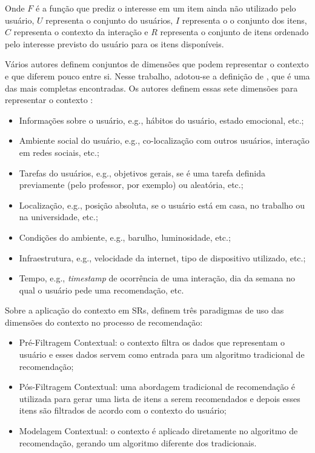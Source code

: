 Onde $F$ é a função que prediz o interesse em um item ainda não utilizado pelo usuário, $U$ representa o conjunto do
usuários, $I$ representa o o conjunto dos itens, $C$ representa o contexto da interação e $R$ representa o conjunto de itens
ordenado pelo interesse previsto do usuário para os itens disponíveis.

Vários autores definem conjuntos de dimensões que podem representar o contexto
\cite{schilit1994context, chen2000survey, zimmermann2007operational} e que diferem pouco entre si. Nesse trabalho,
adotou-se a definição de , que é uma das mais completas encontradas. Os autores definem essas
sete dimensões para representar o contexto \cite{schmidt1999there}:

\begin{itemize}
\item Informações sobre o usuário, e.g., hábitos do usuário, estado emocional, etc.;
\item Ambiente social do usuário, e.g., co-localização com outros usuários, interação em redes sociais, etc.;
\item Tarefas do usuários, e.g., objetivos gerais, se é uma tarefa definida previamente (pelo professor, por exemplo)
ou aleatória, etc.;
\item Localização, e.g., posição absoluta, se o usuário está em casa, no trabalho ou na universidade, etc.;
\item Condições do ambiente, e.g., barulho, luminosidade, etc.;
\item Infraestrutura, e.g., velocidade da internet, tipo de dispositivo utilizado, etc.;
\item Tempo, e.g., \textit{timestamp} de ocorrência de uma interação, dia da semana no qual o usuário pede uma recomendação, etc.
\end{itemize}

Sobre a aplicação do contexto em SRs,  definem três paradigmas de uso das dimensões
do contexto no processo de recomendação:

\begin{itemize}
\item Pré-Filtragem Contextual: o contexto filtra os dados que representam o usuário e esses dados servem
como entrada para um algoritmo tradicional de recomendação;
\item Pós-Filtragem Contextual: uma abordagem tradicional de recomendação é utilizada para gerar uma lista de
itens a serem recomendados e depois esses itens são filtrados de acordo com o contexto do usuário;
\item Modelagem Contextual: o contexto é aplicado diretamente no algoritmo de recomendação, gerando um
algoritmo diferente dos tradicionais.
\end{itemize}

